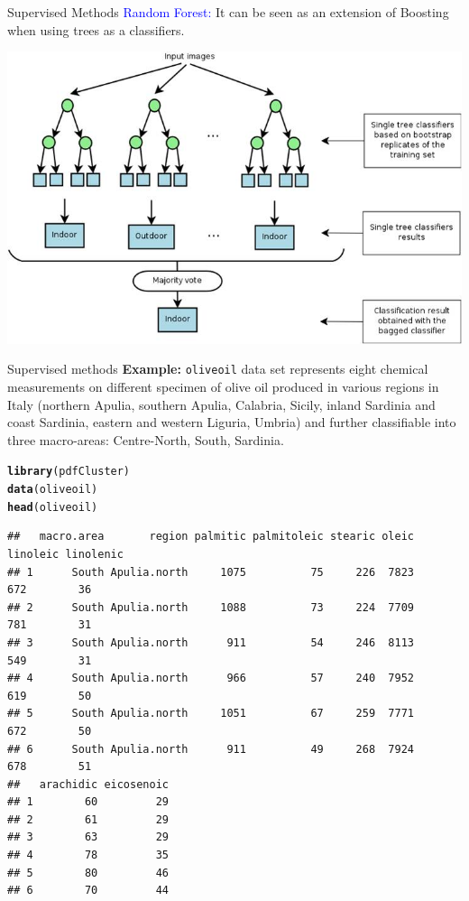\documentclass[10pt,xcolor=dvipsnames]{beamer}\usepackage[]{graphicx}\usepackage[]{color}
\makeatletter
\newcommand{\hlstd}[1]{\textcolor[rgb]{0.345,0.345,0.345}{#1}}%
\newcommand{\hlkwd}[1]{\textcolor[rgb]{0.737,0.353,0.396}{\textbf{#1}}}%
\newenvironment{kframe}{%
 \def\at@end@of@kframe{}%
 \ifinner\ifhmode%
  \def\at@end@of@kframe{\end{minipage}}%
  \begin{minipage}{\columnwidth}%
 \fi\fi%
 \def\FrameCommand##1{\hskip\@totalleftmargin \hskip-\fboxsep
 \colorbox{shadecolor}{##1}\hskip-\fboxsep
     \hskip-\linewidth \hskip-\@totalleftmargin \hskip\columnwidth}%
 \MakeFramed {\advance\hsize-\width
   \@totalleftmargin\z@ \linewidth\hsize
   \@setminipage}}%
 {\par\unskip\endMakeFramed%
 \at@end@of@kframe}
\newenvironment{knitrout}{}{} %
\makeatother
\begin{document}
\begin{frame}{Supervised Methods}
\textcolor{blue}{Random Forest:} It can be seen as an extension of Boosting when using trees as a classifiers.

\bigskip
 \includegraphics{figures/RF.jpg}
\end{frame}


\begin{frame}[fragile]{Supervised methods}
\textbf{Example:} {\tt oliveoil} data set represents eight chemical measurements 
on different specimen of olive oil produced in various regions in 
Italy (northern Apulia, southern Apulia, Calabria, Sicily, inland Sardinia 
and coast Sardinia, eastern and western Liguria, Umbria) and further 
classifiable into three macro-areas: Centre-North, South, Sardinia. 

\begin{knitrout}\footnotesize
{}\color{fgcolor}\begin{kframe}
\begin{alltt}
\hlkwd{library}\hlstd{(pdfCluster)}
\hlkwd{data}\hlstd{(oliveoil)}
\hlkwd{head}\hlstd{(oliveoil)}
\end{alltt}
\begin{verbatim}
##   macro.area       region palmitic palmitoleic stearic oleic linoleic linolenic
## 1      South Apulia.north     1075          75     226  7823      672        36
## 2      South Apulia.north     1088          73     224  7709      781        31
## 3      South Apulia.north      911          54     246  8113      549        31
## 4      South Apulia.north      966          57     240  7952      619        50
## 5      South Apulia.north     1051          67     259  7771      672        50
## 6      South Apulia.north      911          49     268  7924      678        51
##   arachidic eicosenoic
## 1        60         29
## 2        61         29
## 3        63         29
## 4        78         35
## 5        80         46
## 6        70         44
\end{verbatim}
\end{kframe}
\end{knitrout}
\end{frame}
\end{document}
